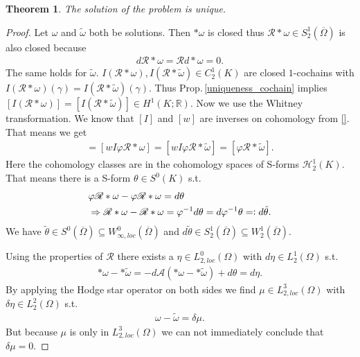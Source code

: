 \documentclass[12pt,a4paper]{article}
\newtheorem{theorem}{Theorem}
\theoremstyle{definition}
\newcommand{\aop}{\mathscr{A}}
\newcommand{\omegabar}{\overline{\Omega}}
\newcommand{\real}{\mathbb{R}}
\newcommand{\rop}{\mathscr{R}} %
\begin{document}
\begin{theorem}
    The solution of the problem is unique.
\end{theorem}
\begin{proof}
    Let $\omega$ and $\tilde{\omega}$ both be solutions. Then $*\omega$ is 
    closed thus $\rop *\omega \in S_2^1(\omegabar)$ is also closed because 
    \begin{align*}
        d \rop * \omega = \rop d*\omega = 0.
    \end{align*}
    The same 
    holds for $\tilde{\omega}$. 
    $I(\rop * \omega), I(\rop * \tilde{\omega}) \in C^1_2(K)$ 
    are closed $1$-cochains with
    $I(\rop * \omega)(\gamma) = I(\rop * \tilde{\omega})(\gamma)$. 
    Thus Prop.\,\ref{uniqueness_cochain} implies 
    $[I(\rop * \omega)] = [I(\rop * \tilde{\omega})] \in H^1(K;\real)$.
    Now we use the Whitney transformation. We know that $[I]$ and $[w]$ are 
    inverses on cohomology from \ref{}. That means we get 
    \begin{align*}
        [\varphi \rop *\omega] = [wI\varphi \rop *\omega] 
        = [wI\varphi \rop *\tilde{\omega}] = [\varphi \rop *\tilde{\omega}].
    \end{align*}
    Here the cohomology classes are in the cohomology spaces of S-forms 
    $\mathscr{H}^1_2(K)$. That means there is a S-form $\theta \in S^0(K)$ s.t.
    \begin{align*}
        &\varphi \rop *\omega - \varphi \rop *\omega = d\theta \\ 
        &\Rightarrow \rop *\omega -  \rop *\omega = \varphi^{-1} d\theta 
        = d\varphi^{-1}\theta =\vcentcolon d\tilde{\theta}.
    \end{align*}
    We have $\tilde{\theta} \in S^0(\omegabar) \subseteq 
    W_{\infty,loc}^0(\omegabar)$ and $d \tilde{\theta} \in S_2^1(\omegabar)
    \subseteq W_2^1(\omegabar)$.

    Using the 
    properties of $\rop$ there exists a $\eta \in L_{2,loc}^0(\Omega)$
    with $d\eta \in L^1_2(\Omega)$ s.t. 
    \begin{align*}
        *\omega - *\tilde{\omega} = -d\aop(*\omega - *\tilde{\omega})
        + d \theta = d\eta.
    \end{align*}
    By applying the Hodge star operator on both sides we find 
    $\mu \in L_{2,loc}^3(\Omega)$ with $\delta \eta \in L^2_2(\Omega)$ s.t.
    \begin{align}
        \omega - \tilde{\omega} = \delta \mu. \label{difference_solutions}
    \end{align}
    But because $\mu$ is only in $L_{2,loc}^3(\Omega)$ 
    we can not immediately conclude that $\delta \mu = 0$.


\end{proof}
\end{document}
